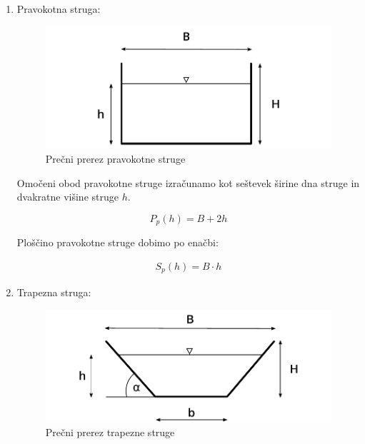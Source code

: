 \begin{enumerate}
	\item Pravokotna struga:
	
	\begin{figure}[ht!]
		\begin{centering}
			\includegraphics{slike/konsumpcijska_krivulja/rectangularChannel.pdf}		
			\caption{Prečni prerez pravokotne struge}\label{fig:pravokotna struga}
		\end{centering}
	\end{figure}
	

	Omočeni obod pravokotne struge izračunamo kot seštevek širine dna struge in dvakratne višine struge $h$.
	
	\begin{ceqn}
	\begin{equation}
	P_{p}(h) = B + 2h
	\end{equation}
	\end{ceqn}
	
	Ploščino pravokotne struge dobimo po enačbi:
	
	\begin{ceqn}
	\begin{align}
	S_{p}(h) = B \cdot h
	\end{align}
	\end{ceqn}
	
	\item Trapezna struga:
	
		\begin{figure}[ht!]
			\begin{centering}
				\includegraphics{slike/konsumpcijska_krivulja/trapezoidChannel.pdf}		
				\caption{Prečni prerez trapezne struge}\label{fig:trapezna struga}
			\end{centering}
		\end{figure}
	

\end{enumerate}
